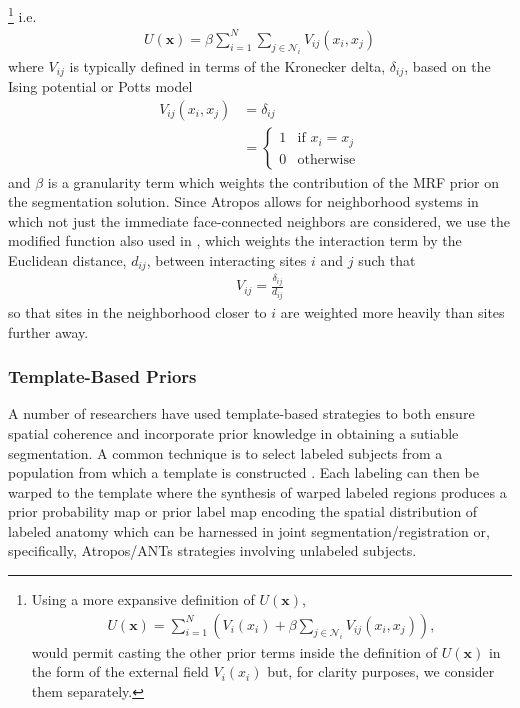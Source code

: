 \documentclass[11pt,english]{article}
\begin{document}
\footnote{
Using a more expansive definition of  $U(\mathbf{x})$, 
\begin{align}
U(\mathbf{x}) = \sum_{i = 1}^N \left( V_i(x_i) + \beta \sum_{j \in \mathcal{N}_i} V_{ij}( x_i, x_j ) \right), 
\end{align}
would permit casting the other prior terms inside the definition of $U(\mathbf{x})$ in the form of the external field $V_i(x_i)$ but, for clarity purposes, we consider them separately. 
}
i.e.
\begin{align}\label{eq:U}
U(\mathbf{x}) = \beta \sum_{i = 1}^N \sum_{j \in \mathcal{N}_i} V_{ij}( x_i, x_j )
\end{align}
where $V_{ij}$ is typically defined in terms of the Kronecker delta, $\delta_{ij}$, based on the Ising potential or Potts model \citep{Besag1974}
\begin{align}
V_{ij}(x_i, x_j) &= \delta_{ij} \nonumber \\
                          &= \left\{
                          \begin{array}{ll}
                            1 & \text{if } x_i = x_j \\
                            0 & \text{otherwise}
                          \end{array}
                         \right.   
\end{align}
and $\beta$ is a granularity term which weights the contribution of the MRF prior on the segmentation solution.
Since Atropos allows for neighborhood systems in which not just the immediate face-connected neighbors are considered, we use the modified function also used in \cite{Noe2001}, which weights the interaction term by the Euclidean distance, $d_{ij}$,  between interacting sites $i$ and $j$ such that 
\begin{align}
  V_{ij} = \frac{\delta_{ij}}{d_{ij}}
\end{align}
so that sites in the neighborhood closer to $i$ are weighted more heavily than sites further away.

\subsubsection{Template-Based Priors}
A number of researchers have used template-based strategies to both ensure spatial coherence and incorporate prior knowledge in obtaining a sutiable segmentation.  A common technique is to select labeled subjects from a population from which a template is constructed \citep[e.g.][which is also available in the ANTs toolkit]{Avants2010}.  Each labeling can then be warped to the template where the synthesis of warped labeled regions produces a prior probability map or prior label map encoding the spatial distribution of labeled anatomy which can be harnessed in joint segmentation/registration or, specifically, Atropos/ANTs strategies involving unlabeled subjects.
\end{document}

